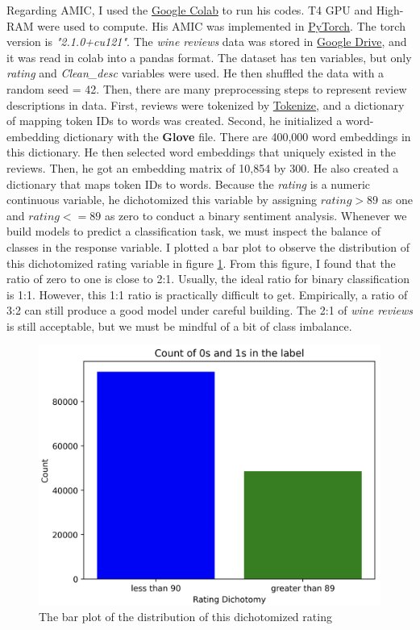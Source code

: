 \documentclass[aoas]{imsart}
\numberwithin{equation}{section}
\theoremstyle{plain}
\theoremstyle{remark}
\begin{document}
Regarding AMIC, I used the \href{https://colab.google/}{Google Colab} to run his codes. T4 GPU and High-RAM were used to compute. His AMIC was implemented in \href{https://pytorch.org/}{PyTorch}. The torch version is \textit{"2.1.0+cu121"}. The \textit{wine reviews} data was stored in \href{https://www.google.com/drive/}{Google Drive}, and it was read in colab into a pandas format. The dataset has ten variables, but only \textit{rating} and \textit{Clean\_desc} variables were used. He then shuffled the data with a random seed = 42. Then, there are many preprocessing steps to represent review descriptions in data. First, reviews were tokenized by \href{https://www.tensorflow.org/api_docs/python/tf/keras/preprocessing/text/Tokenizer}{Tokenize}, and a dictionary of mapping token IDs to words was created. Second, he initialized a word-embedding dictionary with the \textbf{Glove} file. There are 400,000 word embeddings in this dictionary. He then selected word embeddings that uniquely existed in the reviews. Then, he got an embedding matrix of 10,854 by 300. He also created a dictionary that maps token IDs to words. Because the \textit{rating} is a numeric continuous variable, he dichotomized this variable by assigning $rating > 89$ as one and $rating <= 89$ as zero to conduct a binary sentiment analysis. Whenever we build models to predict a classification task, we must inspect the balance of classes in the response variable. I plotted a bar plot to observe the distribution of this dichotomized rating variable in figure \ref{Fig12: dis}. From this figure, I found that the ratio of zero to one is close to 2:1. Usually, the ideal ratio for binary classification is 1:1. However, this 1:1 ratio is practically difficult to get. Empirically, a ratio of 3:2 can still produce a good model under careful building. The 2:1 of \textit{wine reviews} is still acceptable, but we must be mindful of a bit of class imbalance. 
\begin{figure}[ht]
\includegraphics[scale=0.3]{img/dis.png}
\caption{The bar plot of the distribution of this dichotomized rating}
\label{Fig12: dis}
\end{figure}
\end{document}

